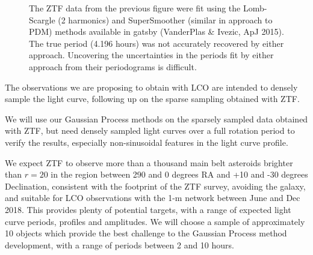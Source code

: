 \documentclass[11pt]{article}
\begin{document}
\begin{figure}[hbt]
\caption{The ZTF data from the previous figure were fit using the Lomb-Scargle (2 harmonics) and SuperSmoother (similar in approach to PDM) methods available in gatsby (VanderPlas \& Ivezic, ApJ 2015). The true period (4.196 hours) was not accurately recovered by either approach. Uncovering the uncertainties in the periods fit by either approach from their periodograms is difficult.}
\end{figure}


\clearpage


%

%

\expdesign
The observations we are proposing to obtain with LCO are intended to
densely sample the light curve, following up on the sparse sampling
obtained with ZTF.

We will use our Gaussian Process methods on the sparsely sampled data
obtained with ZTF, but need densely sampled light curves over a full
rotation period to verify the results, especially non-sinusoidal
features in the light curve profile. 

We expect ZTF to observe more than a thousand main belt asteroids
brighter than $r=20$ in the region between 290 and 0 degrees RA and 
+10 and -30 degrees Declination, consistent with the footprint of the
ZTF survey, avoiding the galaxy, and suitable for LCO observations with
the 1-m network between June and Dec 2018. This provides plenty of
potential targets, with a range of expected light curve periods,
profiles and amplitudes. We will choose a sample of approximately 10
objects which provide the best challenge to the Gaussian Process method
development, with a range of periods between 2 and 10 hours. 
\end{document}
